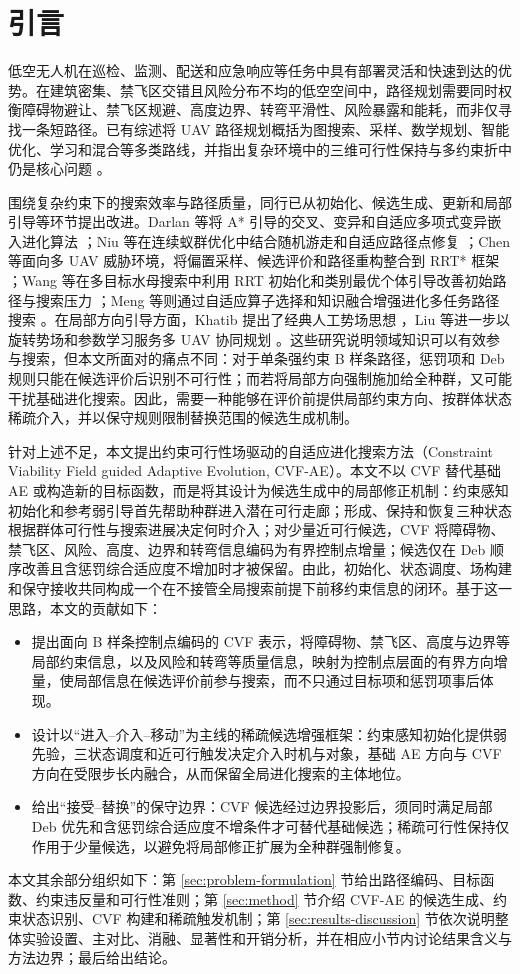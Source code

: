 \section{引言}
\label{sec:introduction}

低空无人机在巡检、监测、配送和应急响应等任务中具有部署灵活和快速到达的优势。在建筑密集、禁飞区交错且风险分布不均的低空空间中，路径规划需要同时权衡障碍物避让、禁飞区规避、高度边界、转弯平滑性、风险暴露和能耗，而非仅寻找一条短路径。已有综述将 UAV 路径规划概括为图搜索、采样、数学规划、智能优化、学习和混合等多类路线，并指出复杂环境中的三维可行性保持与多约束折中仍是核心问题 \citep{Kumar2025UAVReview,Ghambari2024UAVSurvey}。

围绕复杂约束下的搜索效率与路径质量，同行已从初始化、候选生成、更新和局部引导等环节提出改进。Darlan 等将 A* 引导的交叉、变异和自适应多项式变异嵌入进化算法 \citep{Darlan2026DomainSpecificEA}；Niu 等在连续蚁群优化中结合随机游走和自适应路径点修复 \citep{Niu2025ContinuousACO}；Chen 等面向多 UAV 威胁环境，将偏置采样、候选评价和路径重构整合到 RRT* 框架 \citep{Chen2025BiasedSampling}；Wang 等在多目标水母搜索中利用 RRT 初始化和类别最优个体引导改善初始路径与搜索压力 \citep{Wang2024JellyfishUAV}；Meng 等则通过自适应算子选择和知识融合增强进化多任务路径搜索 \citep{Meng2025EvoMultitasking}。在局部方向引导方面，Khatib 提出了经典人工势场思想 \citep{Khatib1986PotentialField}，Liu 等进一步以旋转势场和参数学习服务多 UAV 协同规划 \citep{Liu2025RotationAPF}。这些研究说明领域知识可以有效参与搜索，但本文所面对的痛点不同：对于单条强约束 B 样条路径，惩罚项和 Deb 规则只能在候选评价后识别不可行性；而若将局部方向强制施加给全种群，又可能干扰基础进化搜索。因此，需要一种能够在评价前提供局部约束方向、按群体状态稀疏介入，并以保守规则限制替换范围的候选生成机制。

针对上述不足，本文提出约束可行性场驱动的自适应进化搜索方法（Constraint Viability Field guided Adaptive Evolution, CVF-AE）。本文不以 CVF 替代基础 AE 或构造新的目标函数，而是将其设计为候选生成中的局部修正机制：约束感知初始化和参考弱引导首先帮助种群进入潜在可行走廊；形成、保持和恢复三种状态根据群体可行性与搜索进展决定何时介入；对少量近可行候选，CVF 将障碍物、禁飞区、风险、高度、边界和转弯信息编码为有界控制点增量；候选仅在 Deb 顺序改善且含惩罚综合适应度不增加时才被保留。由此，初始化、状态调度、场构建和保守接收共同构成一个在不接管全局搜索前提下前移约束信息的闭环。基于这一思路，本文的贡献如下：

\begin{itemize}
    \item 提出面向 B 样条控制点编码的 CVF 表示，将障碍物、禁飞区、高度与边界等局部约束信息，以及风险和转弯等质量信息，映射为控制点层面的有界方向增量，使局部信息在候选评价前参与搜索，而不只通过目标项和惩罚项事后体现。
    \item 设计以“进入--介入--移动”为主线的稀疏候选增强框架：约束感知初始化提供弱先验，三状态调度和近可行触发决定介入时机与对象，基础 AE 方向与 CVF 方向在受限步长内融合，从而保留全局进化搜索的主体地位。
    \item 给出“接受--替换”的保守边界：CVF 候选经过边界投影后，须同时满足局部 Deb 优先和含惩罚综合适应度不增条件才可替代基础候选；稀疏可行性保持仅作用于少量候选，以避免将局部修正扩展为全种群强制修复。
\end{itemize}

本文其余部分组织如下：第 \ref{sec:problem-formulation} 节给出路径编码、目标函数、约束违反量和可行性准则；第 \ref{sec:method} 节介绍 CVF-AE 的候选生成、约束状态识别、CVF 构建和稀疏触发机制；第 \ref{sec:results-discussion} 节依次说明整体实验设置、主对比、消融、显著性和开销分析，并在相应小节内讨论结果含义与方法边界；最后给出结论。
